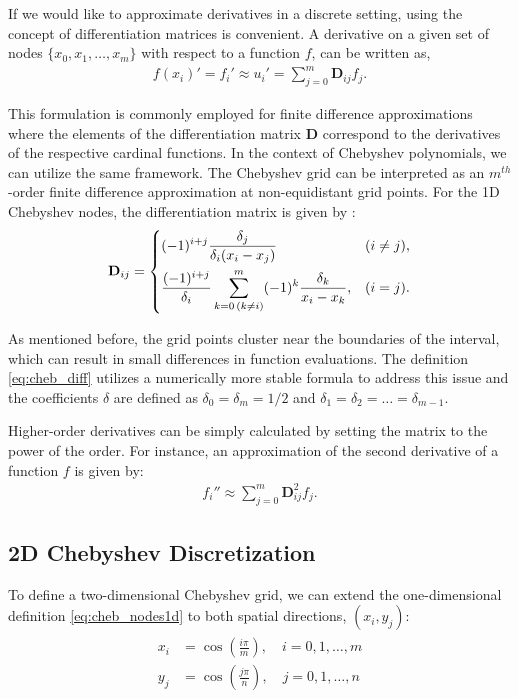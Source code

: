 If we would like to approximate derivatives in a discrete setting, using the
concept of differentiation matrices is convenient. A derivative on a given set
of nodes $\{x_0, x_1,\dots, x_m\}$ with respect to a function $f$, can be written
as,
\begin{align}
f(x_i)' = f_i' \approx u_i' = \sum_{j=0}^{m}\mathbf{D}_{ij}f_j.
\end{align}

This formulation is commonly employed for finite difference approximations
where the elements of the differentiation matrix $\mathbf{D}$ correspond to the
derivatives of the respective cardinal functions. In the context of Chebyshev
polynomials, we can utilize the same framework. The Chebyshev grid can be
interpreted as an $m^{th}$-order finite difference approximation at
non-equidistant grid points. For the 1D Chebyshev nodes, the differentiation
matrix is given by \citep{meseguer2020}:
\begin{align}
\mathbf{D}_{ij} =
\begin{dcases}
  (-1)^{i+j} \frac{\delta_j}{\delta_i(x_i - x_j)}
    & (i \neq j), \\
  \frac{(-1)^{i+j}}{\delta_i} \sum^{m}_{k=0 \, (k \neq i)}
    (-1)^{k} \frac{\delta_k}{x_i - x_k}, & (i = j).
\end{dcases}
\label{eq:cheb_diff}
\end{align}

As mentioned before, the grid points cluster near the boundaries of the
interval, which can result in small differences in function evaluations. The
definition \eqref{eq:cheb_diff} utilizes a numerically more stable formula to
address this issue and the coefficients $\delta$ are defined as $\delta_0 = \delta_m = 1/2$
and $\delta_1 = \delta_2 = \dots = \delta_{m-1}$.

Higher-order derivatives can be simply calculated by setting the matrix to the
power of the order. For instance, an approximation of the second derivative of
a function $f$ is given by:
\begin{align}
  f_i'' \approx \sum_{j=0}^{m}\mathbf{D}_{ij}^{2}f_j.
\end{align}

\subsection{2D Chebyshev Discretization} \label{sec:2d_cheb}

To define a two-dimensional Chebyshev grid, we can extend the one-dimensional
definition \eqref{eq:cheb_nodes1d} to both spatial directions, $(x_i, y_j)$:
\vspace{-10pt}
\begin{align} \label{eq:cheb_nodes2d}
  \begin{split}
  x_i & = \cos(\frac{i \pi}{m}), \quad i = 0,1,\dots,m \\ 
  y_j &  = \cos(\frac{j \pi}{n}), \quad j = 0,1,\dots,n
  \end{split}
\end{align}

